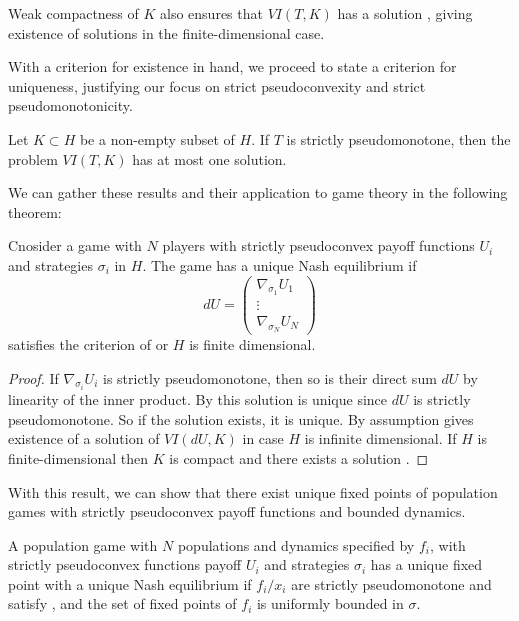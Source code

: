 \begin{remark}
  \label{rem:weak_compact}
  Weak compactness of $K$ also ensures that $VI(T,K)$ has a solution \citep[Theorem 12.1, P. 510]{hadjisavvas2006handbook}, giving existence of solutions in the finite-dimensional case.
\end{remark}
With a criterion for existence in hand, we proceed to state a criterion for uniqueness, justifying our focus on strict pseudoconvexity and strict pseudomonotonicity.
\begin{theorem}
  \label{thm:uniqueness}
  Let $K\subset H$ be a non-empty subset of $H$. If $T$ is strictly pseudomonotone, then the problem $VI(T,K)$ has at most one solution.
\end{theorem}
We can gather these results and their application to game theory in the following theorem:
\begin{theorem}
  Cnosider a game with $N$ players with strictly pseudoconvex payoff functions $U_i$ and strategies $\sigma_i$ in $H$. The game has a unique Nash equilibrium if
  \begin{equation}
    dU=
    \begin{pmatrix}
      \nabla_{\sigma_1} U_1\\
      \vdots \\
      \nabla_{\sigma_N} U_N
    \end{pmatrix}
  \end{equation}
  satisfies the criterion of  or $H$ is finite dimensional.
\end{theorem}
\begin{proof}
   If $\nabla_{\sigma_i} U_i$ is strictly pseudomonotone, then so is their direct sum $dU$ by linearity of the inner product. By  this solution is unique since $dU$ is strictly pseudomonotone. So if the solution exists, it is unique. By assumption  gives existence of a solution of $VI(dU,K)$ in case $H$ is infinite dimensional. If $H$ is finite-dimensional then $K$ is compact and there exists a solution .
\end{proof}
With this result, we can show that there exist unique fixed points of population games with strictly pseudoconvex payoff functions and bounded dynamics.
\begin{theorem}
  \label{thm:pop_game_exists_unique}
  A population game with $N$ populations and dynamics specified by $f_i$, with strictly pseudoconvex functions payoff $U_i$ and strategies $\sigma_i$ has a unique fixed point with a unique Nash equilibrium if $f_i/x_i$ are strictly pseudomonotone and satisfy , and the set of fixed points of $f_i$ is uniformly bounded in $\sigma$.
\end{theorem}

